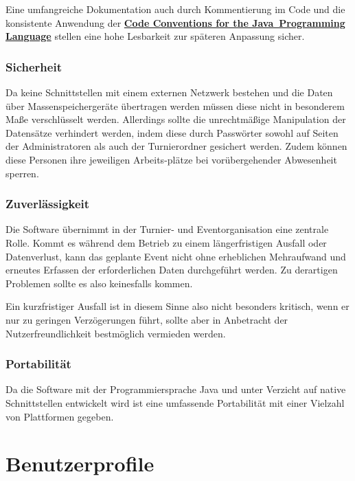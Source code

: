 \documentclass[11pt]{article}
\begin{document}
Eine umfangreiche Dokumentation auch durch Kommentierung im Code und die konsistente Anwendung der \href{http://www.oracle.com/technetwork/java/codeconvtoc-136057.html}{\textbf{Code Conventions for the Java\texttrademark\ Programming Language}} stellen eine hohe Lesbarkeit zur späteren Anpassung sicher.

\subsubsection{Sicherheit}

Da keine Schnittstellen mit einem externen Netzwerk bestehen und die Daten über Massenspeichergeräte übertragen werden müssen diese nicht in besonderem Maße verschlüsselt werden. Allerdings sollte die unrechtmäßige Manipulation der Datensätze verhindert werden, indem diese durch Passwörter sowohl auf Seiten der Administratoren als auch der Turnierordner gesichert werden. Zudem können diese Personen ihre jeweiligen Arbeits-plätze bei vorübergehender Abwesenheit sperren.

\newpage

\subsubsection{Zuverlässigkeit}

Die Software übernimmt in der Turnier- und Eventorganisation eine zentrale Rolle. Kommt es während dem Betrieb zu einem längerfristigen Ausfall oder Datenverlust, kann das geplante Event nicht ohne erheblichen Mehraufwand und erneutes Erfassen der erforderlichen Daten durchgeführt werden. Zu derartigen Problemen sollte es also keinesfalls kommen.

Ein kurzfristiger Ausfall ist in diesem Sinne also nicht besonders kritisch, wenn er nur zu geringen Verzögerungen führt, sollte aber in Anbetracht der Nutzerfreundlichkeit bestmöglich vermieden werden.

\subsubsection{Portabilität}

Da die Software mit der Programmiersprache Java und unter Verzicht auf native Schnittstellen entwickelt wird ist eine umfassende Portabilität mit einer Vielzahl von Plattformen gegeben.

\newpage

\section{Benutzerprofile}
\end{document}
